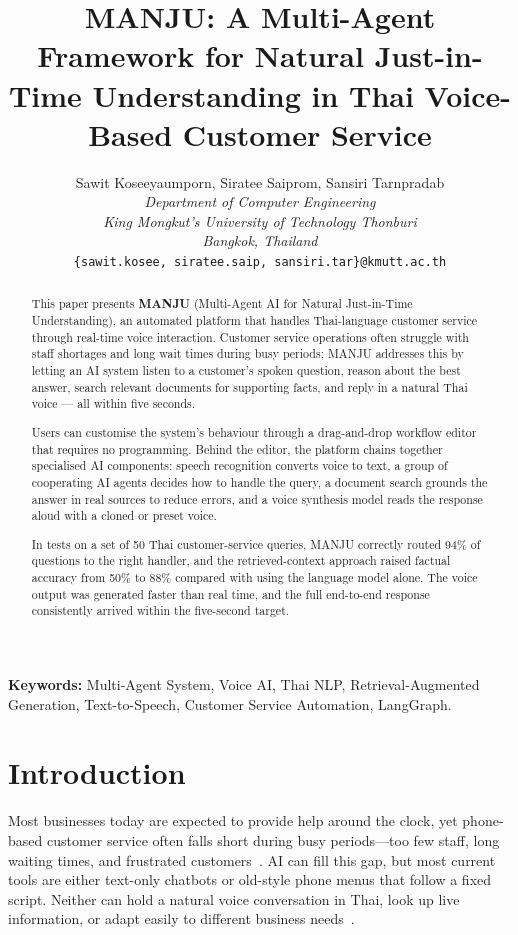 \documentclass[10pt, a4paper, twocolumn]{article}
\title{\textbf{MANJU: A Multi-Agent Framework for Natural Just-in-Time Understanding in Thai Voice-Based Customer Service}}
\author{
    Sawit Koseeyaumporn, Siratee Saiprom, Sansiri Tarnpradab \\
    \textit{Department of Computer Engineering} \\
    \textit{King Mongkut's University of Technology Thonburi} \\
    \textit{Bangkok, Thailand} \\
    \texttt{\{sawit.kosee, siratee.saip, sansiri.tar\}@kmutt.ac.th}
}
\date{}
\begin{document}
\maketitle

\begin{abstract}
This paper presents \textbf{MANJU} (Multi-Agent AI for Natural
Just-in-Time Understanding), an automated platform that handles
Thai-language customer service through real-time voice interaction.
Customer service operations often struggle with staff shortages and
long wait times during busy periods; MANJU addresses this by letting
an AI system listen to a customer's spoken question, reason about the
best answer, search relevant documents for supporting facts, and reply
in a natural Thai voice --- all within five seconds.

Users can customise the system's behaviour through a drag-and-drop
workflow editor that requires no programming. Behind the editor, the
platform chains together specialised AI components: speech recognition
converts voice to text, a group of cooperating AI agents decides how
to handle the query, a document search grounds the answer in real
sources to reduce errors, and a voice synthesis model reads the
response aloud with a cloned or preset voice.

In tests on a set of 50 Thai customer-service queries, MANJU correctly
routed 94\% of questions to the right handler, and the retrieved-context
approach raised factual accuracy from 50\% to 88\% compared with
using the language model alone. The voice output was generated faster
than real time, and the full end-to-end response consistently arrived
within the five-second target.
\end{abstract}

\vspace{0.5em}
\noindent\textbf{Keywords:} Multi-Agent System, Voice AI, Thai NLP,
Retrieval-Augmented Generation, Text-to-Speech, Customer Service
Automation, LangGraph.

\section{Introduction}

Most businesses today are expected to provide help around the clock, yet
phone-based customer service often falls short during busy periods---too
few staff, long waiting times, and frustrated
customers~\cite{gans2003callcenters}.
AI can fill this gap, but most current tools are either text-only chatbots
or old-style phone menus that follow a fixed script.
Neither can hold a natural voice conversation in Thai, look up live
information, or adapt easily to different business
needs~\cite{manjuProgReport}.
\end{document}
